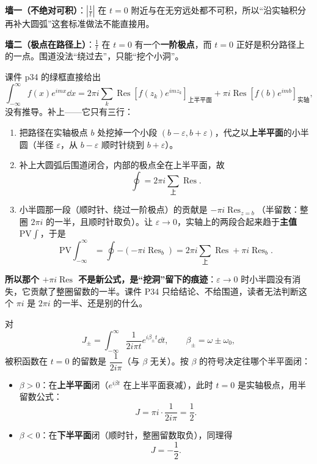 \documentclass[11pt]{ctexart}
\begin{document}
\textbf{墙一（不绝对可积）}：$\left|\frac{1}{t}\right|$ 在 $t=0$ 附近与在无穷远处都不可积，所以“沿实轴积分再补大圆弧”这套标准做法不能直接用。

\textbf{墙二（极点在路径上）}：$\frac{1}{t}$ 在 $t=0$ 有一个\textbf{一阶极点}，而 $t=0$ 正好是积分路径上的一点。围道没法“绕过去”，只能“挖个小洞”。


课件 p34 的绿框直接给出
\[ \int_{-\infty}^{\infty}f(x)e^{imx}\dd x=2\pi i\sum_{k}\operatorname{Res}\left[f(z_k)e^{imz_k}\right]_{\text{上半平面}}+\pi i\operatorname{Res}\left[f(b)e^{imb}\right]_{\text{实轴}} ,\]
没有推导。补上——它只有三行：

\begin{enumerate}
\item 把路径在实轴极点 $b$ 处挖掉一个小段 $(b-\varepsilon,b+\varepsilon)$，代之以\textbf{上半平面}的小半圆（半径 $\varepsilon$，从 $b-\varepsilon$ 顺时针绕到 $b+\varepsilon$）。
\item 补上大圆弧后围道闭合，内部的极点全在上半平面，故
\[ \oint=2\pi i\sum_{\text{上}}\operatorname{Res} .\]
\item 小半圆那一段（顺时针、绕过一阶极点）的贡献是 $-\pi i\operatorname{Res}_{z=b}$（半留数：整圈 $2\pi i$ 的一半，且顺时针取负）。让 $\varepsilon\to0$，实轴上的两段合起来趋于\textbf{主值} $\mathrm{PV}\int$，于是
\[ \mathrm{PV}\int_{-\infty}^{\infty}=\oint-\left(-\pi i\operatorname{Res}_{b}\right)=2\pi i\sum_{\text{上}}\operatorname{Res}+\pi i\operatorname{Res}_{b} .\]
\end{enumerate}

\textbf{所以那个 $+\pi i\operatorname{Res}$ 不是新公式，是“挖洞”留下的痕迹}：$\varepsilon\to0$ 时小半圆没有消失，它贡献了整圈留数的一半。课件 P34 只给结论、不给围道，读者无法判断这个 $\pi i$ 是 $2\pi i$ 的一半、还是别的什么。


对
\[ J_{\pm}=\int_{-\infty}^{\infty}\frac{1}{2i\pi t}e^{i\beta_{\pm}t}\dd t,\qquad \beta_{\pm}=\omega\pm\omega_0 ,\]
被积函数在 $t=0$ 的留数是 $\dfrac{1}{2i\pi}$（与 $\beta$ 无关）。按 $\beta$ 的符号决定往哪个半平面闭：

\begin{itemize}
\item $\beta>0$：在\textbf{上半平面}闭（$e^{i\beta t}$ 在上半平面衰减），此时 $t=0$ 是实轴极点，用半留数公式：
\[ J=\pi i\cdot\frac{1}{2i\pi}=\frac{1}{2} .\]
\item $\beta<0$：在\textbf{下半平面}闭（顺时针，整圈留数取负），同理得
\[ J=-\frac{1}{2} .\]
\end{itemize}
\end{document}
